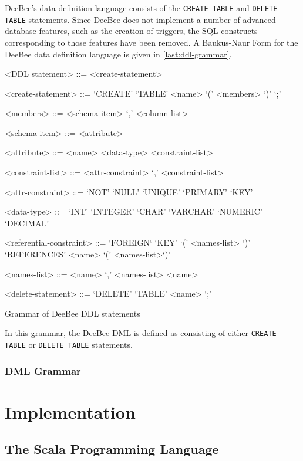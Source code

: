 DeeBee's data definition language consists of the \texttt{CREATE TABLE} and \texttt{DELETE TABLE} statements. Since DeeBee does not implement a number of advanced database features, such as the creation of triggers, the SQL constructs corresponding to those features have been removed. A Baukus-Naur Form for the DeeBee data definition language is given in \cref{last:ddl-grammar}.
\begin{listing}
\begin{grammar}
<DDL statement>  ::= <create-statement>
	 \alt <delete-statement>
	 
<create-statement> ::= `CREATE' `TABLE' <name> `(' <members> `)' `;'

<members> ::= <schema-item> `,' <column-list>
	\alt <schema-item>

<schema-item> ::= <attribute>  	 
	
<attribute> ::= <name> <data-type> <constraint-list>

<constraint-list> ::= <attr-constraint> `,' <constraint-list>
	\alt <attr-constraint>
	
<attr-constraint> ::= `NOT' `NULL' \alt `UNIQUE' \alt `PRIMARY' `KEY'

<data-type> ::= `INT'  \alt `INTEGER' \alt `CHAR' \alt `VARCHAR' \alt `NUMERIC'  \alt `DECIMAL'

<referential-constraint> ::= `FOREIGN` `KEY' `(' <names-list> `)' `REFERENCES' <name> `(' <names-list>`)'

<names-list> ::= <name> `,' <names-list> \alt <name>

<delete-statement> ::= `DELETE' `TABLE' <name> `;'
\end{grammar}
\caption{Grammar of DeeBee DDL statements}
\label{lst:ddl-grammar}
\end{listing}

In this grammar, the DeeBee DML is defined as consisting of either \texttt{CREATE TABLE} or \texttt{DELETE TABLE} statements. 

\subsubsection{DML Grammar}
\section{Implementation}

\subsection{The Scala Programming Language}


